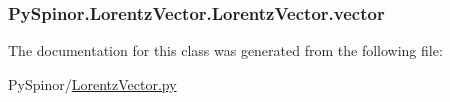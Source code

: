 \subsubsection[{vector}]{\setlength{\rightskip}{0pt plus 5cm}Py\+Spinor.\+Lorentz\+Vector.\+Lorentz\+Vector.\+vector}\label{class_py_spinor_1_1_lorentz_vector_1_1_lorentz_vector_a094448bd25db3631dfda6402c7c258e1}


The documentation for this class was generated from the following file\+:\begin{DoxyCompactItemize}
\item 
Py\+Spinor/\hyperlink{_lorentz_vector_8py}{Lorentz\+Vector.\+py}\end{DoxyCompactItemize}
